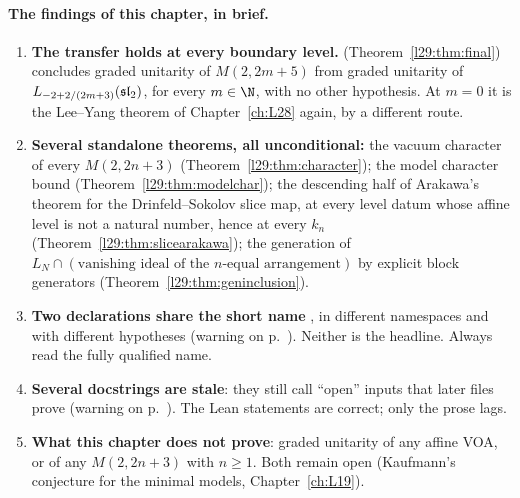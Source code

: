 \paragraph{The findings of this chapter, in brief.}
\begin{enumerate}
\item \textbf{The transfer holds at every boundary level.} 
  (Theorem~\ref{l29:thm:final}) concludes graded unitarity of $M(2,2m+5)$ from graded unitarity of
  $L_{-2+2/(2m+3)}(\mathfrak{sl}_2)$, for every $m\in\N$, with no other hypothesis. At $m=0$ it is the Lee--Yang
  theorem of Chapter~\ref{ch:L28} again, by a different route.
\item \textbf{Several standalone theorems, all unconditional:} the vacuum character of every $M(2,2n+3)$
  (Theorem~\ref{l29:thm:character}); the model character bound (Theorem~\ref{l29:thm:modelchar}); the descending half
  of Arakawa's theorem for the Drinfeld--Sokolov slice map, at every level datum whose affine level is not a natural number,
  hence at every $k_n$ (Theorem~\ref{l29:thm:slicearakawa}); the generation of $L_N\cap(\text{vanishing ideal of the $n$-equal arrangement})$ by explicit
  block generators (Theorem~\ref{l29:thm:geninclusion}).
\item \textbf{Two declarations share the short name} , in different
  namespaces and with different hypotheses (warning on p.~\pageref{l29:warn:clash}). Neither is the headline. Always read the
  fully qualified name.
\item \textbf{Several docstrings are stale}: they still call ``open'' inputs that later files prove
  (warning on p.~\pageref{l29:warn:stale}). The Lean statements are correct; only the prose lags.
\item \textbf{What this chapter does not prove}: graded unitarity of any affine VOA, or of any $M(2,2n+3)$ with
  $n\ge1$. Both remain open (Kaufmann's conjecture for the minimal models, Chapter~\ref{ch:L19}).
\end{enumerate}

